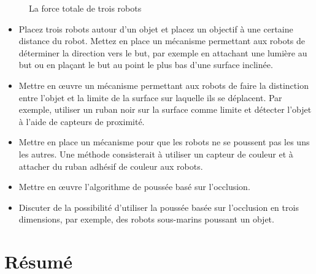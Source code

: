 \begin{figure}
\begin{center}
\caption{La force totale de trois robots}\label{fig.total-force}
\end{center}
\end{figure}

\begin{framed}
\begin{itemize}
\item Placez trois robots autour d'un objet et placez un objectif à une certaine distance du robot. Mettez en place un mécanisme permettant aux robots de déterminer la direction vers le but, par exemple en attachant une lumière au but ou en plaçant le but au point le plus bas d'une surface inclinée.
\item Mettre en œuvre un mécanisme permettant aux robots de faire la distinction entre l'objet et la limite de la surface sur laquelle ils se déplacent. Par exemple, utiliser un ruban noir sur la surface comme limite et détecter l'objet à l'aide de capteurs de proximité.
\item Mettre en place un mécanisme pour que les robots ne se poussent pas les uns les autres. Une méthode consisterait à utiliser un capteur de couleur et à attacher du ruban adhésif de couleur aux robots.
\item Mettre en œuvre l'algorithme de poussée basé sur l'occlusion.
\item Discuter de la possibilité d'utiliser la poussée basée sur l'occlusion en trois dimensions, par exemple, des robots sous-marins poussant un objet.
\end{itemize}
\end{framed}

\section{Résumé}

